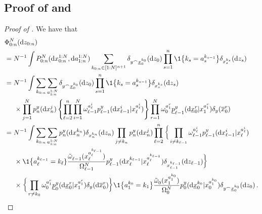 \subsection*{Proof of  and }
\label{sec:proof_lems}
\begin{proof}[Proof of ]
    We have that
    \begin{align*} 
        & \bfilter{0:n}{N}{\rmd z_{0:n}} \\
        & = N^{-1} \int \lawSMC{0:n}(\rmd \iparticle{1:N}{0:n}, \rmd \ianc{1:N}{1:n}) \sum_{k_{0:n} \in [1:N]^{n+1}}  \delta_{\cat{\lmeas}{\lbottomstate^{k_0}_{0}}}(\rmd z_0) \prod_{s = 1}^n \1 \big\{ k_s = \ianc{k_{s-1}}{s} \big\} \delta_{\lstate^{k_s} _{s}}(\rmd z_s) \\
        & = N^{-1} \int \sum_{k_{0:n}} \sum_{\ianc{1:N}{1:n}}  \delta_{\cat{\lmeas}{\lbottomstate^{k_0}_{0}}}(\rmd z_0) \prod_{s = 1}^n \1 \big\{k_s = \ianc{k_{s-1}}{s}\big\} \delta_{\iparticle{k_s}{s}}(\rmd z_s) \\
        & \hspace{.5cm} \times \prod_{j = 1}^N \bwopt{n}{y}{}{}(\rmd \iparticle{j}{n}) \left\{ \prod_{\ell = 2}^n  \prod_{i = 1}^N \weight{\ianc{i}{\ell}}{\ell-1} \bwopt{\ell-1}{y}{\iparticle{\ianc{i}{\ell}}{\ell}}{\rmd \iparticle{i}{\ell-1}} \right\} \prod_{r = 1}^N  \weight{\ianc{r}{1}}{0} \bbwopt{\ell-1}{y}{\iparticle{\ianc{r}{1}}{1}}{\rmd \lbottomstate^{r} _{0}} \delta_\lmeas(\ltopstate^r _0)\\
        & = N^{-1}\int \sum_{k_{0:n}} \sum_{\ianc{1:N}{1:n}} \bwopt{n}{y}{}{}(\rmd \iparticle{k_n}{n}) \delta_{\iparticle{k_n}{n}}(\rmd z_n) \prod_{j \neq k_n} \bwopt{n}{y}{}{}(\rmd \iparticle{j}{n}) \prod_{\ell = 2}^n \bigg\{ \prod_{i \neq k_{\ell-1} } \weight{\ianc{i}{\ell}}{\ell-1} \bwopt{\ell-1}{y}{\iparticle{\ianc{i}{\ell}}{\ell}}{\rmd \iparticle{i}{\ell-1}}\\
        & \hspace{.5cm} \times \1 \big\{ \ianc{k_{\ell-1}}{\ell} = k_\ell\} \wratio{}{\ell-1}{\iparticle{\ianc{k_{\ell-1}}{\ell}}{\ell}} \bwopt{\ell-1}{y}{\iparticle{\ianc{k_{\ell-1}}{\ell}}{\ell}}{\rmd \iparticle{k_{\ell-1}}{\ell}} \delta_{\iparticle{k_{\ell-1}}{\ell-1}}(\rmd z_{\ell-1}) \bigg\} \\
        & \hspace{.5cm} \times \bigg\{ \prod_{r \neq k_0} \weight{\ianc{r}{1}}{0} \bbwopt{0}{y}{\iparticle{\ianc{r}{1}}{1}}{\rmd \lbottomstate^{r} _{0}} \delta_\lmeas(\rmd \ltopstate^r _0) \bigg\} \1 \big\{ \ianc{k_0}{1} = k_1 \big\} \wratio{}{0}{\iparticle{\ianc{k_{0}}{1}}{1}} \bwopt{0}{y}{\iparticle{\ianc{k_{0}}{1}}{0}}{\rmd \lbottomstate^{k_0} _0} \delta_{\cat{\lmeas}{\lbottomstate^{k_0} _0}}(\rmd z_{0}) \eqsp.

\end{align*}
\end{proof}
